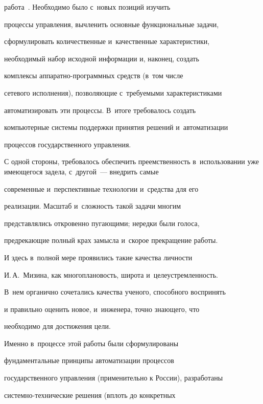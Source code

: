 работа~\cite{8-miz}. Необходимо было с~новых позиций изучить


процессы управления, вычленить основные функциональные задачи,


сформулировать количественные и~качественные характеристики,


необходимый набор исходной информации и, наконец, создать


комплексы ап\-па\-рат\-но-про\-грам\-мных средств (в~том числе


сетевого исполнения), позволяющие с~требуемыми характеристиками


автоматизировать эти процессы. В~итоге требовалось создать


компьютерные системы поддержки принятия решений и~автоматизации


процессов государственного управления.





     С одной стороны, требовалось обеспечить преемственность в~использовании уже имеющегося задела, с~другой~--- внедрить самые


современные и~перспективные технологии и~средства для его


реализации. Масштаб и~сложность такой задачи многим


представлялись откровенно пугающими; нередки были голоса,


предрекающие полный крах замысла и~скорое прекращение работы.





     И здесь в~полной мере проявились такие качества личности


И.\,А.~Мизина, как многоплановость, широта и~целеустремленность.


В~нем органично сочетались качества ученого, способного воспринять


и правильно оценить новое, и~инженера, точно знающего, что


необходимо для достижения цели.





     Именно в~процессе этой работы были сформулированы


фундаментальные принципы автоматизации процессов


государственного управления (применительно к России), разработаны


сис\-тем\-но-тех\-ни\-че\-ские решения (вплоть до конкретных


